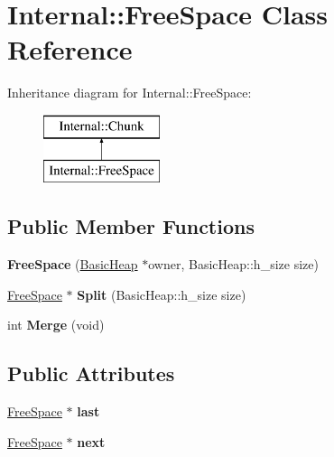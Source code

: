 \hypertarget{class_internal_1_1_free_space}{}\section{Internal\+:\+:Free\+Space Class Reference}
\label{class_internal_1_1_free_space}
Inheritance diagram for Internal\+:\+:Free\+Space\+:\begin{figure}[H]
\begin{center}
\leavevmode
\includegraphics[height=2.000000cm]{class_internal_1_1_free_space}
\end{center}
\end{figure}
\subsection*{Public Member Functions}
\begin{DoxyCompactItemize}
\item 
\mbox{\label{class_internal_1_1_free_space_aa49a37f66e5839379a2be70f4a014515}} 
{\bfseries Free\+Space} (\hyperlink{class_basic_heap}{Basic\+Heap} $\ast$owner, Basic\+Heap\+::h\+\_\+size size)
\item 
\mbox{\label{class_internal_1_1_free_space_ab3d263aa397c45d8be07e66d715cdfee}} 
\hyperlink{class_internal_1_1_free_space}{Free\+Space} $\ast$ {\bfseries Split} (Basic\+Heap\+::h\+\_\+size size)
\item 
\mbox{\label{class_internal_1_1_free_space_ac001c0431b6942012e7d03f30937eb4c}} 
int {\bfseries Merge} (void)
\end{DoxyCompactItemize}
\subsection*{Public Attributes}
\begin{DoxyCompactItemize}
\item 
\mbox{\label{class_internal_1_1_free_space_ad8ef6322f41635762ac8bb03e109ad14}} 
\hyperlink{class_internal_1_1_free_space}{Free\+Space} $\ast$ {\bfseries last}
\item 
\mbox{\label{class_internal_1_1_free_space_a7f23ff600c1e06b38c41cd1babb6e4b4}} 
\hyperlink{class_internal_1_1_free_space}{Free\+Space} $\ast$ {\bfseries next}
\end{DoxyCompactItemize}
